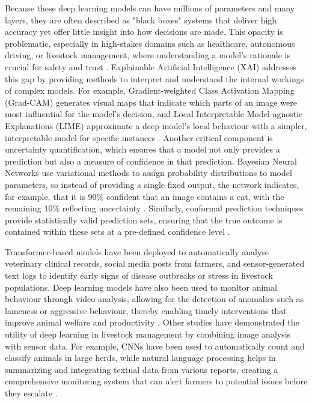 Because these deep learning models can have millions of parameters and many layers, they are often described as "black boxes" systems that deliver high accuracy yet offer little insight into how decisions are made. This opacity is problematic, especially in high-stakes domains such as healthcare, autonomous driving, or livestock management, where understanding a model’s rationale is crucial for safety and trust \cite{bengio2013representation}. Explainable Artificial Intelligence (XAI) addresses this gap by providing methods to interpret and understand the internal workings of complex models. For example, Gradient-weighted Class Activation Mapping (Grad-CAM) generates visual maps that indicate which parts of an image were most influential for the model’s decision, and Local Interpretable Model-agnostic Explanations (LIME) approximate a deep model’s local behaviour with a simpler, interpretable model for specific instances 
\cite{ribeiro2016should, selvaraju2017grad}. Another critical component is uncertainty quantification, which ensures that a model not only provides a prediction but also a measure of confidence in that prediction. Bayesian Neural Networks use variational methods to assign probability distributions to model parameters, so instead of providing a single fixed output, the network indicates, for example, that it is 90\% confident that an image contains a cat, with the remaining 10\% reflecting uncertainty \cite{gal_dropout_2016}. Similarly, conformal prediction techniques provide statistically valid prediction sets, ensuring that the true outcome is contained within these sets at a pre-defined confidence level \cite{Angelopoulos2021}.

Transformer-based models have been deployed to automatically analyse veterinary clinical records, social media posts from farmers, and sensor-generated text logs to identify early signs of disease outbreaks or stress in livestock populations. Deep learning models have also been used to monitor animal behaviour through video analysis, allowing for the  detection of anomalies such as lameness or aggressive behaviour, thereby enabling timely interventions that improve animal welfare and productivity 
\cite{fazzari2024animal}. Other studies have demonstrated the utility of deep learning in livestock management by combining image analysis with sensor data. For example, CNNs have been used to automatically count and classify animals in large herds, while natural language processing helps in summarizing and integrating textual data from various reports, creating a comprehensive monitoring system that can alert farmers to potential issues before they escalate \cite{GARCIA2020105826}.

